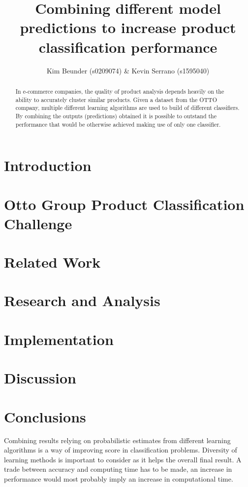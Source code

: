 \documentclass [paper=a4, fontsize=11pt]{article}%
\title{Combining different model predictions to increase product classification performance}
\author{Kim Beunder (s0209074) \& Kevin Serrano (s1595040)}
\begin{document}
\maketitle
\begin{abstract}
	In e-commerce companies, the quality of product analysis depends heavily on the ability to accurately cluster similar products. Given a dataset from the OTTO company, multiple different learning algorithms are used to build of different classifiers. By combining the outputs (predictions) obtained it is possible to outstand the performance that would be otherwise achieved making use of only one classifier.
\end{abstract}
\section{Introduction}

\section{Otto Group Product Classification Challenge}

\section{Related Work}

\section{Research and Analysis}

\section{Implementation}

\section{Discussion}

\section{Conclusions}
Combining results relying on probabilistic estimates from different learning algorithms is a way of improving score in classification problems. Diversity of learning methods is important to consider as it helps the overall final result. A trade between accuracy and computing time has to be made, an increase in performance would most probably imply an increase in computational time.


\end{document}
